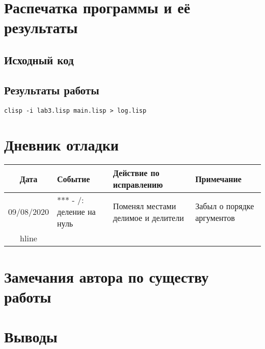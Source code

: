 \documentclass[12pt]{article}
\begin{document}
\section{Распечатка программы и её результаты}

\subsection{Исходный код}

\subsection{Результаты работы}
\lstinline{clisp -i lab3.lisp main.lisp > log.lisp}

\section{Дневник отладки}
\noindent
\begin{tabularx}{\linewidth}{|c|X|X|X|}
\hline
Дата & Событие & Действие по исправлению & Примечание \\
\hline
09/08/2020 & *** - /: деление на нуль & Поменял местами делимое и делители & Забыл о порядке аргументов \\
hline
\end{tabularx}

\section{Замечания автора по существу работы}

\section{Выводы}
\end{document}
